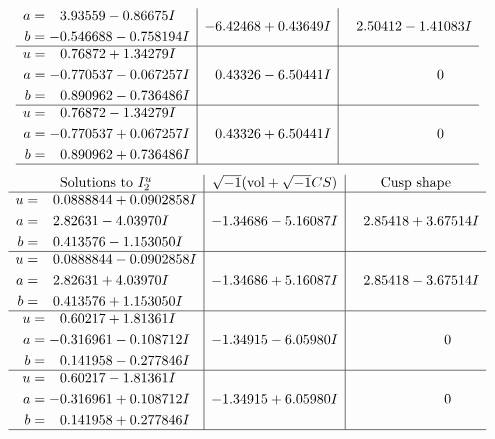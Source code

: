 \documentclass[1p]{elsarticle_modified}
\theoremstyle{definition}
\newcommand{\I}{\sqrt{-1}}
\begin{document}
$$\begin{array}{c|c|c}
\begin{aligned}
a &= \phantom{-}3.93559 - 0.86675 I \\
b &= -0.546688 - 0.758194 I\end{aligned}
 & -6.42468 + 0.43649 I & \phantom{-}2.50412 - 1.41083 I \\ \hline\begin{aligned}
u &= \phantom{-}0.76872 + 1.34279 I \\
a &= -0.770537 - 0.067257 I \\
b &= \phantom{-}0.890962 - 0.736486 I\end{aligned}
 & \phantom{-}0.43326 - 6.50441 I & \phantom{-0.000000 } 0 \\ \hline\begin{aligned}
u &= \phantom{-}0.76872 - 1.34279 I \\
a &= -0.770537 + 0.067257 I \\
b &= \phantom{-}0.890962 + 0.736486 I\end{aligned}
 & \phantom{-}0.43326 + 6.50441 I & \phantom{-0.000000 } 0\\
 \hline 
 \end{array}$$\newpage$$\begin{array}{c|c|c}  
\text{Solutions to }I^u_{2}& \I (\text{vol} + \sqrt{-1}CS) & \text{Cusp shape}\\
 \hline 
\begin{aligned}
u &= \phantom{-}0.0888844 + 0.0902858 I \\
a &= \phantom{-}2.82631 - 4.03970 I \\
b &= \phantom{-}0.413576 - 1.153050 I\end{aligned}
 & -1.34686 - 5.16087 I & \phantom{-}2.85418 + 3.67514 I \\ \hline\begin{aligned}
u &= \phantom{-}0.0888844 - 0.0902858 I \\
a &= \phantom{-}2.82631 + 4.03970 I \\
b &= \phantom{-}0.413576 + 1.153050 I\end{aligned}
 & -1.34686 + 5.16087 I & \phantom{-}2.85418 - 3.67514 I \\ \hline\begin{aligned}
u &= \phantom{-}0.60217 + 1.81361 I \\
a &= -0.316961 - 0.108712 I \\
b &= \phantom{-}0.141958 - 0.277846 I\end{aligned}
 & -1.34915 - 6.05980 I & \phantom{-0.000000 } 0 \\ \hline\begin{aligned}
u &= \phantom{-}0.60217 - 1.81361 I \\
a &= -0.316961 + 0.108712 I \\
b &= \phantom{-}0.141958 + 0.277846 I\end{aligned}
 & -1.34915 + 6.05980 I & \phantom{-0.000000 } 0\\
 \hline 
 \end{array}$$\newpage
\end{document}
